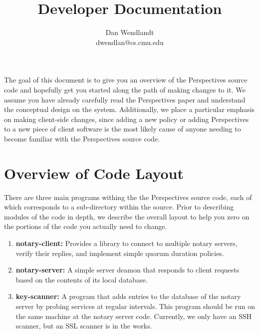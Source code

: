 \documentclass[pdftex,singlecolumn,11pt,letterpaper]{article}
\title{ \name Developer Documentation }
\author{Dan Wendlandt \\ dwendlan@cs.cmu.edu }
\newcommand{\name}{Perspectives\xspace}
\begin{document}
\maketitle 


The goal of this document is to give you an overview of the \name 
source code and hopefully get you started along the path of making changes to
it.  We assume you have already carefully read the \name paper and 
understand the conceptual design on the system.  Additionally, we place a 
particular emphasis on making client-side changes, since adding a new 
policy or adding \name to a new piece of client software is the most
likely cause of anyone needing to become familiar with the \name 
source code.  

\section{Overview of Code Layout}

There are three main programs withing the the \name source code, each of 
which corresponds to a sub-directory within the source.  Prior to 
describing modules of the code in depth, we describe the overall layout 
to help you zero on the portions of the code you actually need to change. 

\begin{enumerate}
\item \textbf{notary-client:} Provides a library to connect to multiple 
notary servers, verify their replies, and implement simple quorum duration
policies.   
\item \textbf{notary-server:} A simple server deamon that responds to client 
requests based on the contents of its local database.  
\item \textbf{key-scanner:}  A program that adds entries to the database 
of the notary server by probing services at regular intervals.  This 
program should be run on the same machine at the notary server code.  
Currently, we only have an SSH scanner, but an SSL scanner is in the works.   
\end{enumerate} 
\end{document}
